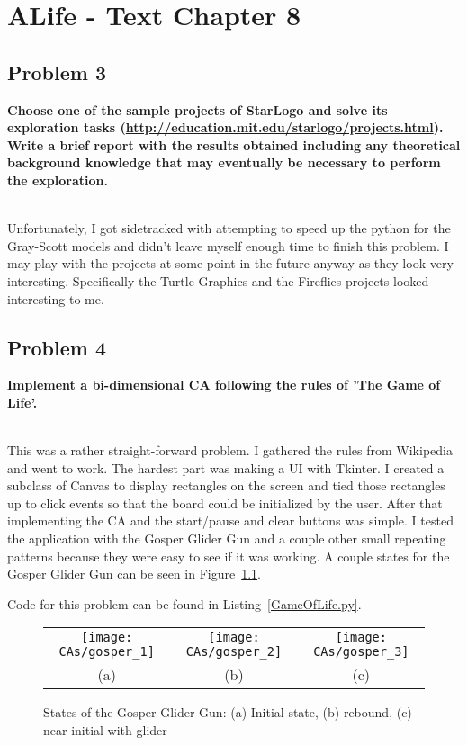 
\chapter{ALife - Text Chapter 8}

\section{Problem 3}
\textbf{
Choose one of the sample projects of StarLogo and solve its exploration tasks (\url{http://education.mit.edu/starlogo/projects.html}). Write a brief report with the results obtained including any theoretical background knowledge that may eventually be necessary to perform the exploration.
}

\hfill \\

Unfortunately, I got sidetracked with attempting to speed up the python for the Gray-Scott models and didn't leave myself enough time to finish this problem. I may play with the projects at some point in the future anyway as they look very interesting. Specifically the Turtle Graphics and the Fireflies projects looked interesting to me.


\section{Problem 4}
\textbf{
Implement a bi-dimensional CA following the rules of 'The Game of Life'.
}

\hfill \\

This was a rather straight-forward problem. I gathered the rules from Wikipedia and went to work. The hardest part was making a UI with Tkinter. I created a subclass of Canvas to display rectangles on the screen and tied those rectangles up to click events so that the board could be initialized by the user. After that implementing the CA and the start/pause and clear buttons was simple. I tested the application with the Gosper Glider Gun and a couple other small repeating patterns because they were easy to see if it was working. A couple states for the Gosper Glider Gun can be seen in Figure~\ref{gosper}.

Code for this problem can be found in Listing~\ref{GameOfLife.py}.

\begin{figure}
\centering
\begin{tabular}{c c c}
\texttt{[image: CAs/gosper\_1]} &
\texttt{[image: CAs/gosper\_2]} &
\texttt{[image: CAs/gosper\_3]} \\

(a) & (b) & (c) \\
\end{tabular}
\caption{States of the Gosper Glider Gun: (a) Initial state, (b) rebound, (c) near initial with glider}
\label{gosper}
\end{figure}
